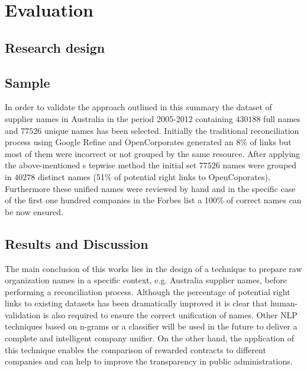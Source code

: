 \documentclass{llncs}
\begin{document}
\section{Evaluation}

\subsection{Research design}
% 
\subsection{Sample}
In order to validate the approach outlined in this summary the dataset of supplier names in Australia in the period 2005-2012 containing $430188$ full names 
and $77526$ unique names has been selected. Initially the traditional reconciliation process using 
Google Refine and OpenCorporates generated an 8\% of links but most of them were 
incorrect or not grouped by the same resource. After applying the above-mentioned s
tepwise method the initial set $77526$ names were grouped in $40278$ 
distinct names (51\% of potential right links to OpenCoporates). 
Furthermore these unified names were reviewed by hand and in the specific case 
of the first one hundred companies in the Forbes list a 100\% of correct names can be now ensured.
 
\subsection{Results and Discussion}
The main conclusion of this works lies in the design of a technique to prepare 
raw organization names in a specific context, e.g. Australia supplier names,  
before performing a reconciliation process. Although the percentage of potential 
right links to existing datasets has been dramatically improved it is clear that 
human-validation is also required to ensure the correct unification of names. 
Other NLP techniques based on n-grams or a classifier will be used in the future 
to deliver a complete and intelligent company unifier. On the other hand, the 
application of this technique enables the comparison of rewarded contracts to 
different companies and can help to improve the transparency in public 
administrations.
\end{document}
